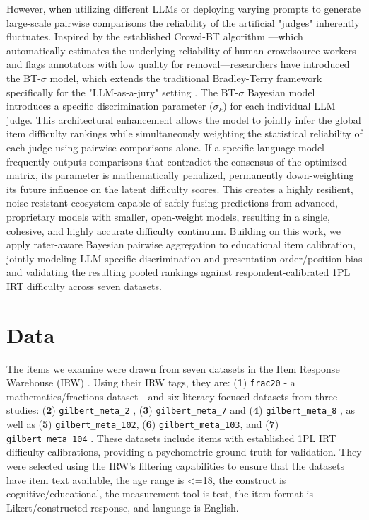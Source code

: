 \documentclass[11pt]{article}
\begin{document}
However, when utilizing different LLMs or deploying varying prompts to generate large-scale pairwise comparisons the reliability of the artificial "judges" inherently fluctuates. Inspired by the established Crowd-BT algorithm \citep{chenPairwiseRankingAggregation2013}—which automatically estimates the underlying reliability of human crowdsource workers and flags annotators with low quality for removal—researchers have introduced the BT-$\sigma$ model, which extends the traditional Bradley-Terry framework specifically for the "LLM-as-a-jury" setting \citep{qianWhoCanWe2026}. The BT-$\sigma$ Bayesian model introduces a specific discrimination parameter ($\sigma_k$) for each individual LLM judge. This architectural enhancement allows the model to jointly infer the global item difficulty rankings while simultaneously weighting the statistical reliability of each judge using pairwise comparisons alone. If a specific language model frequently outputs comparisons that contradict the consensus of the optimized matrix, its  parameter is mathematically penalized, permanently down-weighting its future influence on the latent difficulty scores. This creates a highly resilient, noise-resistant ecosystem capable of safely fusing predictions from advanced, proprietary models with smaller, open-weight models, resulting in a single, cohesive, and highly accurate difficulty continuum. Building on this work, we apply rater-aware Bayesian pairwise aggregation to educational item calibration, jointly modeling LLM-specific discrimination and presentation-order/position bias and validating the resulting pooled rankings against respondent-calibrated 1PL IRT difficulty across seven datasets.


\section{Data}
\label{sec:data}

The items we examine were drawn from seven datasets in the Item Response Warehouse (IRW) \citep{domingueIntroductionItemResponse2025}. Using their IRW tags, they are: (\textbf{1}) \texttt{frac20} - a mathematics/fractions dataset \citep{tatsuokaDataAnalyticMethods2002} - and six literacy-focused datasets from three studies: (\textbf{2}) \texttt{gilbert\_meta\_2} \citep{kimReplicationDataLongitudinal2023}, (\textbf{3}) \texttt{gilbert\_meta\_7} and (\textbf{4}) \texttt{gilbert\_meta\_8} \citep{kimTimeTransferLongterm2024}, as well as (\textbf{5}) \texttt{gilbert\_meta\_102}, (\textbf{6}) \texttt{gilbert\_meta\_103}, and (\textbf{7}) \texttt{gilbert\_meta\_104} \citep{relyeaAssetBasedImplementationStructured2025}. These datasets include items with established 1PL IRT difficulty calibrations, providing a psychometric ground truth for validation. They were selected using the IRW's filtering capabilities to ensure that the datasets have item text available, the age range is <=18, the construct is cognitive/educational, the measurement tool is test, the item format is Likert/constructed response, and language is English. 
\end{document}
